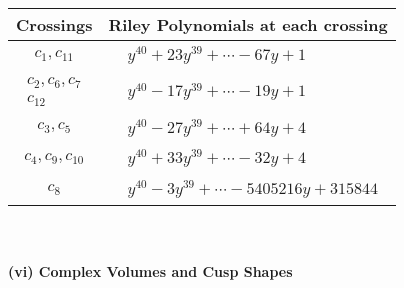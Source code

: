 \documentclass[1p]{elsarticle_modified}
\theoremstyle{definition}
\begin{document}
\begin{tabular}{m{50pt}|m{274pt}}
Crossings & \hspace{64pt}Riley Polynomials at each crossing \\
\hline $$\begin{aligned}c_{1},c_{11}\end{aligned}$$&$\begin{aligned}
&y^{40}+23 y^{39}+\cdots-67 y+1
\end{aligned}$\\
\hline $$\begin{aligned}c_{2},c_{6},c_{7}\\c_{12}\end{aligned}$$&$\begin{aligned}
&y^{40}-17 y^{39}+\cdots-19 y+1
\end{aligned}$\\
\hline $$\begin{aligned}c_{3},c_{5}\end{aligned}$$&$\begin{aligned}
&y^{40}-27 y^{39}+\cdots+64 y+4
\end{aligned}$\\
\hline $$\begin{aligned}c_{4},c_{9},c_{10}\end{aligned}$$&$\begin{aligned}
&y^{40}+33 y^{39}+\cdots-32 y+4
\end{aligned}$\\
\hline $$\begin{aligned}c_{8}\end{aligned}$$&$\begin{aligned}
&y^{40}-3 y^{39}+\cdots-5405216 y+315844
\end{aligned}$\\
\hline
\end{tabular}\\~\\
\newpage\flushleft \textbf{(vi) Complex Volumes and Cusp Shapes}
\end{document}
